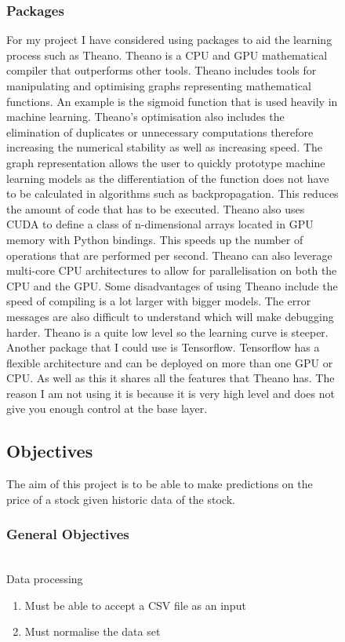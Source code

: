 \documentclass{article}
\begin{document}
\begin{figure}[h!]
\subsubsection{Packages}
For my project I have considered using packages to aid the learning process such as Theano. Theano is a CPU and GPU mathematical compiler that outperforms other tools. Theano includes tools for manipulating and optimising graphs representing mathematical functions. An example is the sigmoid function that is used heavily in machine learning. Theano’s optimisation also includes the elimination of duplicates or unnecessary computations therefore increasing the numerical stability as well as increasing speed.  The graph representation allows the user to quickly prototype machine learning models as the differentiation of the function does not have to be calculated in algorithms such as backpropagation. This reduces the amount of code that has to be executed. Theano also uses CUDA to define a class of n-dimensional arrays located in GPU memory with Python bindings. This speeds up the number of operations that are performed per second. Theano can also leverage multi-core CPU architectures to allow for parallelisation on both the CPU and the GPU. Some disadvantages of using Theano include the speed of compiling is a lot larger with bigger models. The error messages are also difficult to understand which will make debugging harder. Theano is a quite low level so the learning curve is steeper.
Another package that I could use is Tensorflow. Tensorflow has a flexible architecture and can be deployed on more than one GPU or CPU. As well as this it shares all the features that Theano has. The reason I am not using it is because it is very high level and does not give you enough control at the base layer.

\subsection{Objectives}
The aim of this project is to be able to make predictions on the price of a stock given historic data of the stock.
\\
\subsubsection{General Objectives}
\\
Data processing
\begin{enumerate}
    \item Must be able to accept a CSV file as an input
    \item Must normalise the data set
\end{enumerate}


\end{figure}
\end{document}
